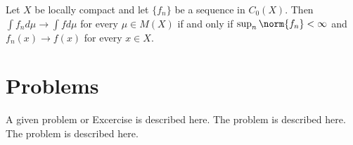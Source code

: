 \begin{prop}
    Let $X$ be locally compact and let $\{f_n\}$ be a sequence in $C_0(X)$. Then $\int f_nd\mu \rightarrow \int fd\mu$ for every $\mu \in M(X)$ if and only if $\sup_n\norm{f_n}< \infty$ and $f_n(x)\rightarrow f(x)$ for every $x \in X$.
\end{prop}




\section*{Problems}
%
\begin{prob}
\label{prob1}
A given problem or Excercise is described here. The
problem is described here. The problem is described here.
\end{prob}




